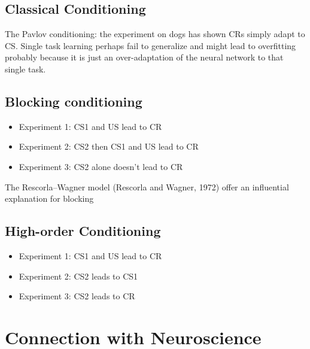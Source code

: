 \subsection{Classical Conditioning}
The Pavlov conditioning: the experiment on dogs has shown \ac{CR}s simply adapt to \ac{CS}. Single task learning perhaps fail to generalize and might lead to overfitting probably because it is just an over-adaptation of the neural network to that single task.

\subsection{Blocking conditioning}
\begin{itemize}
	\item Experiment 1: \ac{CS}1 and \ac{US} lead to \ac{CR}
	\item Experiment 2: \ac{CS}2 then \ac{CS}1 and \ac{US} lead to \ac{CR}
	\item Experiment 3: \ac{CS}2 alone doesn't lead to \ac{CR}
\end{itemize}
The Rescorla–Wagner model (Rescorla and Wagner, 1972) offer an influential explanation for blocking

\subsection{High-order Conditioning}

\begin{itemize}
	\item Experiment 1: \ac{CS}1 and \ac{US} lead to \ac{CR}
	\item Experiment 2: \ac{CS}2 leads to \ac{CS}1
	\item Experiment 3: \ac{CS}2 leads to \ac{CR}
\end{itemize}

\section{Connection with Neuroscience}